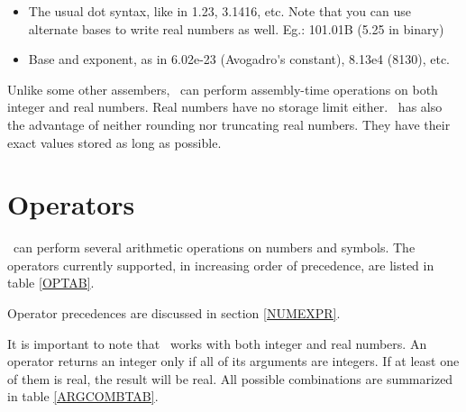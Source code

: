 \documentclass[a4paper,draft,12pt]{book}
\begin{document}
\begin{itemize}
\item{The usual dot syntax}, like in 1.23, 3.1416, etc. Note that you can
use alternate bases to write real numbers as well. Eg.: 101.01B (5.25 in binary)
\item{Base and exponent}, as in 6.02e-23 (Avogadro\'{}s constant), 8.13e4 (8130),
etc.
\end{itemize}

Unlike some other assembers, \popasm\ can perform assembly-time operations
on both integer and real numbers. Real numbers have no storage limit either.
\popasm\ has also the advantage of neither rounding nor truncating real numbers.
They have their exact values stored as long as possible.

\chapter{Operators}
\popasm\ can perform several arithmetic operations on numbers and symbols. The
operators currently supported, in increasing order of precedence, are listed in
table \ref{OPTAB}.

Operator precedences are discussed in section \ref{NUMEXPR}.

It is important to note that \popasm\ works with both integer and
real numbers. An operator returns an integer only if all of its
arguments are integers. If at least one of them is real, the result
will be real. All possible combinations are summarized in table
\ref{ARGCOMBTAB}.
\end{document}
